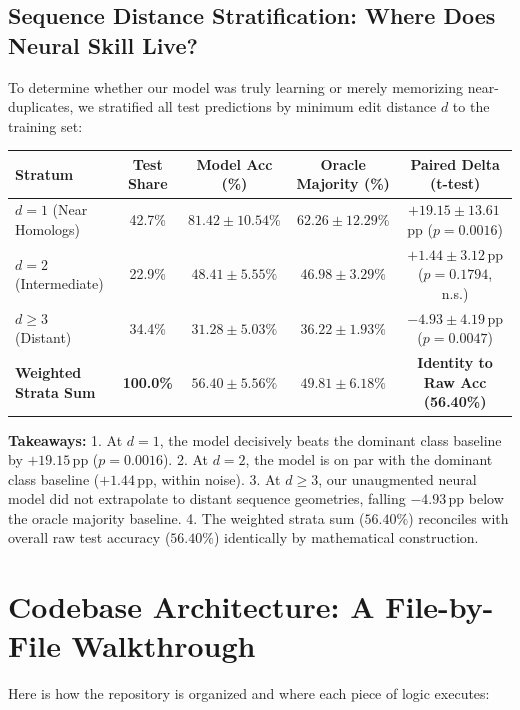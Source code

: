 \documentclass[11pt,a4paper]{report}
\begin{document}
\section{Sequence Distance Stratification: Where Does Neural Skill Live?}
To determine whether our model was truly learning or merely memorizing near-duplicates, we stratified all test predictions by minimum edit distance $d$ to the training set:

\begin{center}
\small
\begin{tabular}{@{}lcccc@{}}
\toprule
\textbf{Stratum} & \textbf{Test Share} & \textbf{Model Acc (\%)} & \textbf{Oracle Majority (\%)} & \textbf{Paired Delta (t-test)} \\
\midrule
$d = 1$ (Near Homologs) & 42.7\% & $\mathbf{81.42 \pm 10.54\%}$ & $62.26 \pm 12.29\%$ & $\mathbf{+19.15 \pm 13.61}$\,pp ($p=0.0016$) \\
$d = 2$ (Intermediate) & 22.9\% & $48.41 \pm 5.55\%$ & $46.98 \pm 3.29\%$ & $+1.44 \pm 3.12$\,pp ($p=0.1794$, n.s.) \\
$d \ge 3$ (Distant) & 34.4\% & $31.28 \pm 5.03\%$ & $36.22 \pm 1.93\%$ & $\mathbf{-4.93 \pm 4.19}$\,pp ($p=0.0047$) \\
\midrule
\textbf{Weighted Strata Sum} & \textbf{100.0\%} & $\mathbf{56.40 \pm 5.56\%}$ & $\mathbf{49.81 \pm 6.18\%}$ & \textbf{Identity to Raw Acc (56.40\%)} \\
\bottomrule
\end{tabular}
\end{center}

\textbf{Takeaways:}
1. At $d=1$, the model decisively beats the dominant class baseline by $+19.15$\,pp ($p=0.0016$).
2. At $d=2$, the model is on par with the dominant class baseline ($+1.44$\,pp, within noise).
3. At $d \ge 3$, our unaugmented neural model did not extrapolate to distant sequence geometries, falling $-4.93$\,pp below the oracle majority baseline.
4. The weighted strata sum ($56.40\%$) reconciles with overall raw test accuracy ($56.40\%$) identically by mathematical construction.

\chapter{Codebase Architecture: A File-by-File Walkthrough}
\label{chap:code}

Here is how the repository is organized and where each piece of logic executes:
\end{document}
